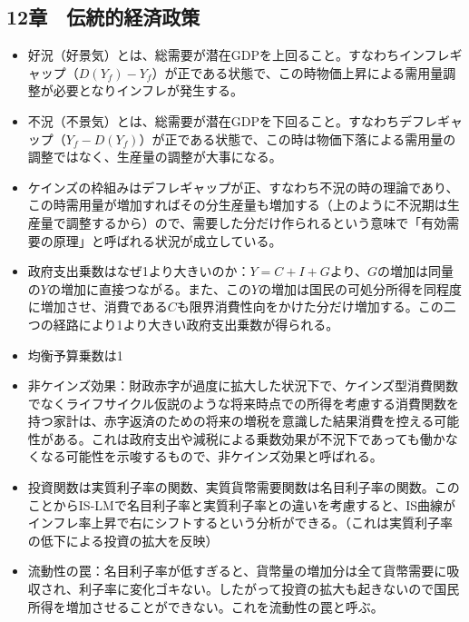 \documentclass{jsarticle}
\begin{document}
\subsection{12章　伝統的経済政策}
\begin{itemize}
	\item 好況（好景気）とは、総需要が潜在GDPを上回ること。すなわちインフレギャップ（$D(Y_f) - Y_f$）が正である状態で、この時物価上昇による需用量調整が必要となりインフレが発生する。
	\item 不況（不景気）とは、総需要が潜在GDPを下回ること。すなわちデフレギャップ（$Y_f - D(Y_f)$）が正である状態で、この時は物価下落による需用量の調整ではなく、生産量の調整が大事になる。
	\item ケインズの枠組みはデフレギャップが正、すなわち不況の時の理論であり、この時需用量が増加すればその分生産量も増加する（上のように不況期は生産量で調整するから）ので、需要した分だけ作られるという意味で「有効需要の原理」と呼ばれる状況が成立している。
	\item 政府支出乗数はなぜ1より大きいのか：$Y = C + I + G$より、$G$の増加は同量の$Y$の増加に直接つながる。また、この$Y$の増加は国民の可処分所得を同程度に増加させ、消費である$C$も限界消費性向をかけた分だけ増加する。この二つの経路により1より大きい政府支出乗数が得られる。
	\item 均衡予算乗数は1
	\item 非ケインズ効果：財政赤字が過度に拡大した状況下で、ケインズ型消費関数でなくライフサイクル仮説のような将来時点での所得を考慮する消費関数を持つ家計は、赤字返済のための将来の増税を意識した結果消費を控える可能性がある。これは政府支出や減税による乗数効果が不況下であっても働かなくなる可能性を示唆するもので、非ケインズ効果と呼ばれる。
	\item 投資関数は実質利子率の関数、実質貨幣需要関数は名目利子率の関数。このことからIS-LMで名目利子率と実質利子率との違いを考慮すると、IS曲線がインフレ率上昇で右にシフトするという分析ができる。（これは実質利子率の低下による投資の拡大を反映）
	\item 流動性の罠：名目利子率が低すぎると、貨幣量の増加分は全て貨幣需要に吸収され、利子率に変化ゴキない。したがって投資の拡大も起きないので国民所得を増加させることができない。これを流動性の罠と呼ぶ。
\end{itemize}
\end{document}
